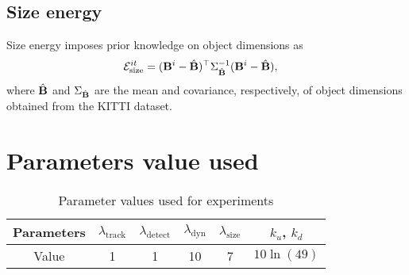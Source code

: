 \documentclass[10pt,twocolumn,letterpaper]{article}
\begin{document}
\subsection{Size energy}
Size energy imposes prior knowledge on object dimensions as
\begin{align}
  \label{eq:totalSizeEnergy}
  \mathcal{E}^{it}_{\text{size}} &= (\mathbf{B}^{i} - \hat{\mathbf{B}})^\top\Sigma_{\hat{\mathbf{B}}}^{-1}(\mathbf{B}^{i} -
  \hat{\mathbf{B}}),
\end{align}
where $\hat{\mathbf{B}}$ and $\Sigma_{\hat{\mathbf{B}}}$ are the mean and covariance, respectively, of object dimensions obtained from the KITTI dataset.

\section{Parameters value used}
\begin{table}[!h]
  \centering
\begin{tabular}{cccccc}
  \toprule
  Parameters
  & $\lambda_{\text{track}}$  
  & $\lambda_{\text{detect}}$ 
  & $\lambda_{\text{dyn}}$    
  & $\lambda_{\text{size}}$   
  & $k_u$, $k_d$ \\
  \midrule
  Value
  & 1
  & 1
  & 10
  & 7
  & $10\ln(49)$\\
  \bottomrule
\end{tabular}
\caption{Parameter values used for experiments}
\label{tab:paramters}
\end{table}
\end{document}
